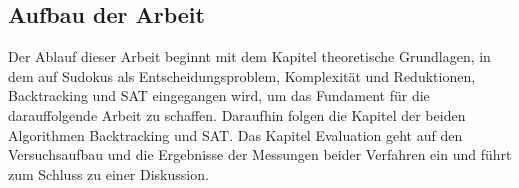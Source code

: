 \subsection{Aufbau der Arbeit}\label{sec:aufbau}

Der Ablauf dieser Arbeit beginnt mit dem Kapitel theoretische Grundlagen, in dem auf Sudokus als Entscheidungsproblem, Komplexität und Reduktionen, Backtracking und SAT eingegangen wird, um das Fundament für die darauffolgende Arbeit zu schaffen. Daraufhin folgen die Kapitel der beiden Algorithmen Backtracking und SAT.
Das Kapitel Evaluation geht auf den Versuchsaufbau und die Ergebnisse der Messungen beider Verfahren ein und führt zum Schluss zu einer Diskussion.

